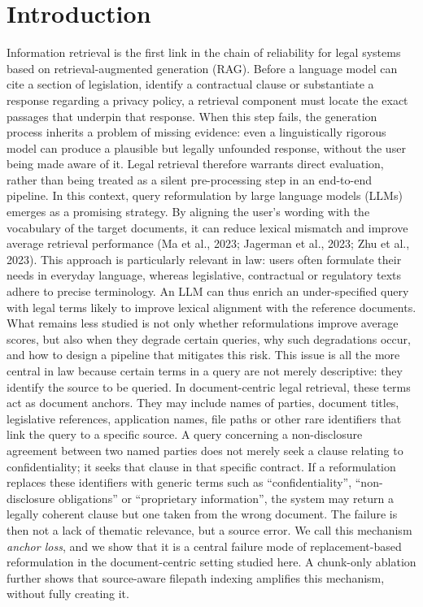\documentclass[a4paper,fleqn]{cas-dc}
\begin{document}
\section{Introduction}
Information retrieval is the first link in the chain of reliability for legal systems based on retrieval-augmented generation (RAG). Before a language model can cite a section of legislation, identify a contractual clause or substantiate a response regarding a privacy policy, a retrieval component must locate the exact passages that underpin that response. When this step fails, the generation process inherits a problem of missing evidence: even a linguistically rigorous model can produce a plausible but legally unfounded response, without the user being made aware of it. Legal retrieval therefore warrants direct evaluation, rather than being treated as a silent pre-processing step in an end-to-end pipeline.
In this context, query reformulation by large language models (LLMs) emerges as a promising strategy. By aligning the user’s wording with the vocabulary of the target documents, it can reduce lexical mismatch and improve average retrieval performance (Ma et al., 2023; Jagerman et al., 2023; Zhu et al., 2023). This approach is particularly relevant in law: users often formulate their needs in everyday language, whereas legislative, contractual or regulatory texts adhere to precise terminology. An LLM can thus enrich an under-specified query with legal terms likely to improve lexical alignment with the reference documents.
What remains less studied is not only whether reformulations improve average scores, but also when they degrade certain queries, why such degradations occur, and how to design a pipeline that mitigates this risk. This issue is all the more central in law because certain terms in a query are not merely descriptive: they identify the source to be queried.
In document-centric legal retrieval, these terms act as document anchors. They may include names of parties, document titles, legislative references, application names, file paths or other rare identifiers that link the query to a specific source. A query concerning a non-disclosure agreement between two named parties does not merely seek a clause relating to confidentiality; it seeks that clause in that specific contract. If a reformulation replaces these identifiers with generic terms such as ``confidentiality'', ``non-disclosure obligations'' or ``proprietary information'', the system may return a legally coherent clause but one taken from the wrong document. The failure is then not a lack of thematic relevance, but a source error. We call this mechanism \textit{anchor loss}, and we show that it is a central failure mode of replacement-based reformulation in the document-centric setting studied here. A chunk-only ablation further shows that source-aware filepath indexing amplifies this mechanism, without fully creating it.
\end{document}
